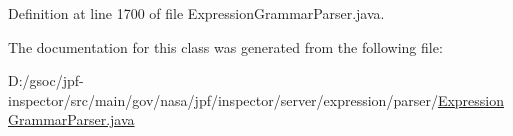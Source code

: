 Definition at line 1700 of file Expression\+Grammar\+Parser.\+java.



The documentation for this class was generated from the following file\+:\begin{DoxyCompactItemize}
\item 
D\+:/gsoc/jpf-\/inspector/src/main/gov/nasa/jpf/inspector/server/expression/parser/\hyperlink{_expression_grammar_parser_8java}{Expression\+Grammar\+Parser.\+java}\end{DoxyCompactItemize}
